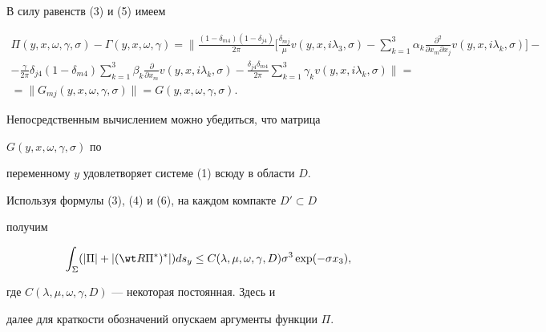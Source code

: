  


\begin{pf} 


В силу равенств (3) и (5) имеем 


\begin{multline*} 


\Pi(y,x,\omega,\gamma,\sigma){-}\Gamma(y,x,\omega,\gamma){=}


\bigg\|\frac{(1{-}\delta_{m4})(1{-}\delta_{j4})}{2\pi} 


\bigg[\frac{\delta_{mj}}{\mu}v(y,x,i\lambda_3,\sigma)- 


\sum^3_{k=1}\alpha_k\frac{\partial^2}{\partial x_m\partial x_j} 


v(y,x,i\lambda_k,\sigma)\bigg]{-}\\ 


%


-\frac{\gamma}{2\pi}\delta_{j4}(1-\delta_{m4}) 


\sum^3_{k=1}\beta_k\frac{\partial}{\partial x_m} 


v(y,x,i\lambda_k,\sigma)-\frac{\delta_{j4}\delta_{m4}}{2\pi} 


\sum^3_{k=1}\gamma_k v(y,x,i\lambda_k,\sigma)\bigg\|= \\ 


%


=\|G_{mj}(y,x,\omega,\gamma,\sigma)\|=G(y,x,\omega,\gamma,\sigma). 


\end{multline*} 


 


Непосредственным вычислением можно убедиться, что матрица 


$G(y,x,\omega,\gamma,\sigma)$ по 


переменному $y$ удовлетворяет системе (1) всюду в области $D$. 


Используя формулы (3), (4) и (6), на каждом компакте $D'\subset D$ 


получим 


\begin{equation} 


\int_\Sigma(|\Pi|+|(\wt R\Pi^*)^*|)ds_y\le 


C(\lambda,\mu,\omega,\gamma,D)\sigma^3\exp(-\sigma x_3), 


\end{equation} 


где $C(\lambda,\mu,\omega,\gamma,D)$ --- некоторая постоянная. Здесь и 


далее для краткости обозначений опускаем аргументы функции $\Pi$. 


\end{pf} 


